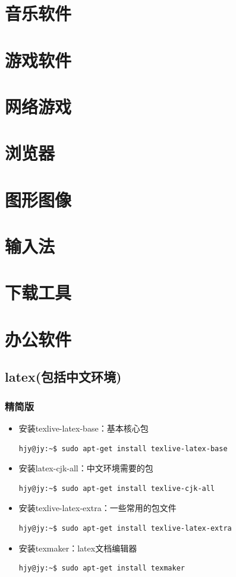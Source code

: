 \clearpage
\section{音乐软件}
\section{游戏软件}
\section{网络游戏}
\section{浏览器}
\section{图形图像}
\section{输入法}
\section{下载工具}
\section{办公软件}
\subsection{latex(包括中文环境)}
\subsubsection{精简版}

\begin{itemize}
\item 安装texlive-latex-base：基本核心包
\begin{lstlisting}[style=BASH]
hjy@jy:~$ sudo apt-get install texlive-latex-base
\end{lstlisting}
\item 安装latex-cjk-all：中文环境需要的包
\begin{lstlisting}[style=BASH]
hjy@jy:~$ sudo apt-get install texlive-cjk-all
\end{lstlisting}
\item 安装texlive-latex-extra：一些常用的包文件
\begin{lstlisting}[style=BASH]
hjy@jy:~$ sudo apt-get install texlive-latex-extra
\end{lstlisting}
\item 安装texmaker：latex文档编辑器
\begin{lstlisting}[style=BASH]
hjy@jy:~$ sudo apt-get install texmaker
\end{lstlisting}
\end{itemize}

